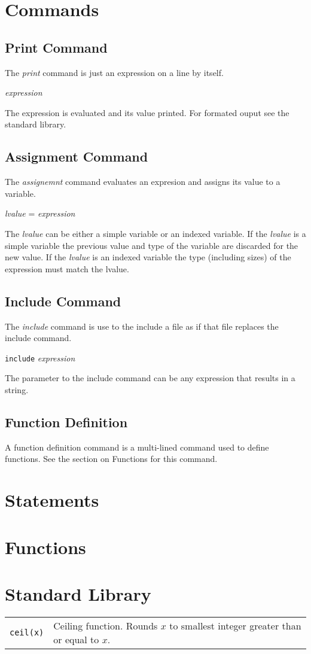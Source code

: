 \documentclass{article}
\begin{document}
\section{Commands}
\subsection{Print Command}
The \emph{print} command is just an expression on a line by itself.
\begin{center}
  \emph{expression}
\end{center}
The expression is evaluated and its value printed.
For formated ouput see the standard library.
\subsection{Assignment Command}
The \emph{assignemnt} command evaluates an expresion and
assigns its value to a variable.
\begin{center}
  \emph{lvalue} = \emph{expression}
\end{center}
The \emph{lvalue} can be either a simple variable or an indexed variable.
If the \emph{lvalue} is a simple variable the previous value and
type of the variable are discarded for the new value.
If the \emph{lvalue} is an indexed variable the type (including sizes)
of the expression must match the lvalue.
\subsection{Include Command}
The \emph{include} command is use to the include a file as if
that file replaces the include command.
\begin{center}
  \verb|include| \emph{expression}
\end{center}
The parameter to the include command can be any expression that results in a string.
\subsection{Function Definition}
A function definition command is a multi-lined command used to define functions.
See the section on Functions for this command.
\section{Statements}
\section{Functions}
\section{Standard Library}
\begin{tabular}{lp{8cm}}
  \verb|ceil(x)| & Ceiling function. Rounds $x$ to smallest integer greater than or equal to $x$. \\
\end{tabular}
\end{document}
